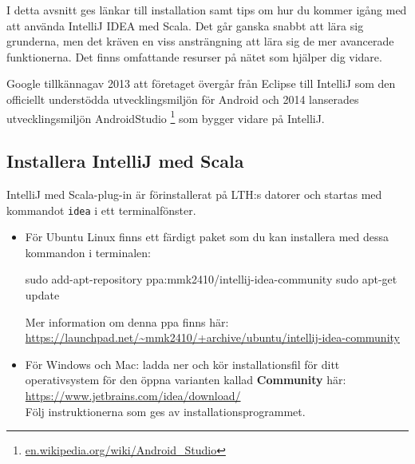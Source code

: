 I detta avsnitt ges länkar till installation samt tips om hur du kommer igång med att använda IntelliJ IDEA med Scala. Det går ganska snabbt att lära sig grunderna, men det kräven en viss ansträngning att lära sig de mer avancerade funktionerna. Det finns omfattande resurser på nätet som hjälper dig vidare. 

Google tillkännagav 2013 att företaget övergår från Eclipse till IntelliJ som den officiellt understödda utvecklingsmiljön för Android och 2014 lanserades utvecklingsmiljön AndroidStudio%
\footnote {\href{https://en.wikipedia.org/wiki/Android_Studio}{en.wikipedia.org/wiki/Android\_Studio}}
 som bygger vidare på IntelliJ. 

\subsection{Installera IntelliJ med Scala}\label{appendix:ide:intellij:install}

IntelliJ med Scala-plug-in är förinstallerat på LTH:s datorer och startas med kommandot \texttt{idea} i ett terminalfönster.

\begin{itemize}
\item För Ubuntu Linux finns ett färdigt paket som du kan installera med dessa kommandon i terminalen: 
\begin{REPLnonum}
sudo add-apt-repository ppa:mmk2410/intellij-idea-community
sudo apt-get update
\end{REPLnonum}
Mer information om denna ppa finns här:\\ \url{https://launchpad.net/~mmk2410/+archive/ubuntu/intellij-idea-community}\item För Windows och Mac: ladda ner och kör installationsfil för ditt operativsystem för den öppna varianten kallad \textbf{Community} här: \\
\url{https://www.jetbrains.com/idea/download/} \\
Följ instruktionerna som ges av installationsprogrammet.
\end{itemize}

